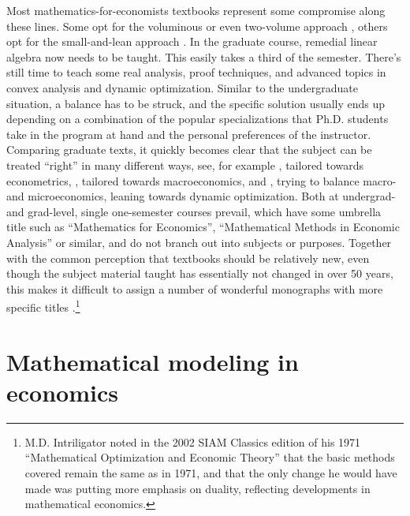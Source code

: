 \documentclass[10pt]{article}
\begin{document}
Most mathematics-for-economists textbooks represent some compromise along these lines. Some opt for the voluminous or even two-volume approach \citep{Simon1994,Hoy2001,Klein2002,Sydsaeter2022}, others opt for the small-and-lean approach \citep{Weintraub1982,Novshek1993}. In the graduate course, remedial linear algebra now needs to be taught. This easily takes a third of the semester. There's still time to teach some real analysis, proof techniques, and advanced topics in convex analysis and dynamic optimization. Similar to the undergraduate situation, a balance has to be struck, and the specific solution usually ends up depending on a combination of the popular specializations that Ph.D. students take in the program at hand and the personal preferences of the instructor. Comparing graduate texts, it quickly becomes clear that the subject can be treated ``right'' in many different ways, see, for example \cite{Ok2007}, tailored towards econometrics, \cite{Corbae2009}, tailored towards macroeconomics, and \cite{Sydsaeter2008}, trying to balance macro- and microeconomics, leaning towards dynamic optimization. Both at undergrad- and grad-level, single one-semester courses prevail, which have some umbrella title such as ``Mathematics for Economics'', ``Mathematical Methods in Economic Analysis'' or similar, and do not branch out into subjects or purposes.  Together with the common perception that textbooks should be relatively new, even though the subject material taught has essentially not changed in over 50 years, this makes it difficult to assign a number of wonderful monographs with more specific titles \citep[for example,][and this is certainly not an exhaustive list]{Seierstad1987,Dixit1990,Intriligator2002,Dhrymes2013}.\footnote{M.D. Intriligator noted in the 2002 SIAM Classics edition of his 1971 ``Mathematical Optimization and Economic Theory'' that the basic methods covered remain the same as in 1971, and that the only change he would have made was putting more emphasis on duality, reflecting developments in mathematical economics.}




\section{Mathematical modeling in economics}
\end{document}
